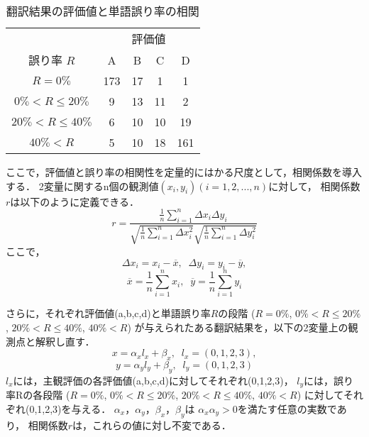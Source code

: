 \begin{table}
\begin{center}
\caption{翻訳結果の評価値と単語誤り率の相関}
\label{JE-closed-trans-recog-correlation}
\begin{tabular}{|c||c|c|c|c|} \hline
 & \multicolumn{4}{c|}{評価値}\\ \cline{2-5}
誤り率 $R$ & A & B & C & D \\ \hline\hline
$R = 0\%$ & 173 & 17 & 1 & 1 \\ \hline
$0\% < R \leq 20\%$ & 9 & 13 & 11 & 2 \\ \hline
$20\% < R \leq 40\%$ & 6 & 10 & 10 & 19 \\ \hline
$40\% < R$ & 5 & 10 & 18 & 161 \\ \hline
\end{tabular}
\end{center}
\end{table}

ここで，評価値と誤り率の相関性を定量的にはかる尺度として，相関係数を導入する．
2変量に関するn個の観測値$(x_i,y_i)(i=1,2,...,n)$に対して，
相関係数$r$は以下のように定義できる．
\begin{displaymath}
r = \frac{
    \frac{1}{n}\sum^n_{i=1}\Delta x_i \Delta y_i
}{
    \sqrt{\frac{1}{n}\sum^n_{i=1}\Delta x_i^2}
    \sqrt{\frac{1}{n}\sum^n_{i=1}\Delta y_i^2}
}
\end{displaymath}
ここで，
\begin{displaymath}
\Delta x_i = x_i - \overline{x}, \;\;
\Delta y_i = y_i - \overline{y},
\end{displaymath}
\begin{displaymath}
\overline{x} = \frac{1}{n}\sum^n_{i=1} x_i, \;\;
\overline{y} = \frac{1}{n}\sum^n_{i=1} y_i
\end{displaymath}

さらに，それぞれ評価値(a,b,c,d)と単語誤り率$R$の段階
($R = 0\%$, $0\% < R \leq 20\%$, $20\% < R \leq 40\%$, $40\% < R$)
が与えられたある翻訳結果を，以下の2変量上の観測点と解釈し直す．
\begin{displaymath}
x = \alpha_x l_x + \beta_x, \;\;
l_x = (0,1,2,3),
\end{displaymath}
\begin{displaymath}
y = \alpha_y l_y + \beta_y , \;\;
l_y = (0,1,2,3)
\end{displaymath}
$l_x$には，主観評価の各評価値(a,b,c,d)に対してそれぞれ(0,1,2,3)，
$l_y$には，誤り率Rの各段階
($R = 0\%$, $0\% < R \leq 20\%$, $20\% < R \leq 40\%$, $40\% < R$)
に対してそれぞれ(0,1,2,3)を与える．
$\alpha_x$，$\alpha_y$，$\beta_x$，$\beta_y$は
$\alpha_x\alpha_y >0$を満たす任意の実数であり，
相関係数$r$は，これらの値に対し不変である．

